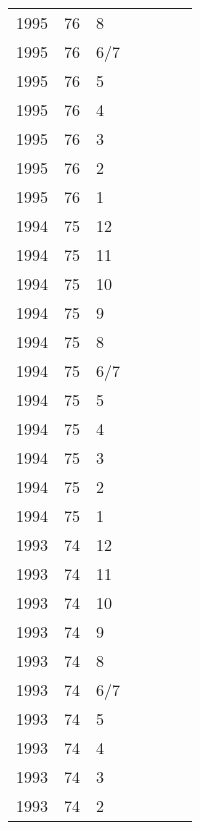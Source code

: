 \begin{longtable}{ |l|l|l|l|p{2.7cm}|l|p{2cm}| }
 1995 & 76 &     8 &         &                &  & \\
 1995 & 76 &   6/7 &         &                &  & \\
 1995 & 76 &     5 &         &                &  & \\
 1995 & 76 &     4 &         &                &  & \\
 1995 & 76 &     3 &         &                &  & \\
 1995 & 76 &     2 &         &                &  & \\
 1995 & 76 &     1 &         &                &  & \\
 1994 & 75 &    12 &         &                &  & \\
 1994 & 75 &    11 &         &                &  & \\
 1994 & 75 &    10 &         &                &  & \\
 1994 & 75 &     9 &         &                &  & \\
 1994 & 75 &     8 &         &                &  & \\
 1994 & 75 &   6/7 &         &                &  & \\
 1994 & 75 &     5 &         &                &   & \\
 1994 & 75 &     4 &         &                &  & \\
 1994 & 75 &     3 &         &                &  & \\
 1994 & 75 &     2 &         &                &  & \\
 1994 & 75 &     1 &         &                &  & \\
 1993 & 74 &    12 &         &                &  & \\
 1993 & 74 &    11 &         &                &  & \\
 1993 & 74 &    10 &         &                &  & \\
 1993 & 74 &     9 &         &                &  & \\
 1993 & 74 &     8 &         &                &  & \\
 1993 & 74 &   6/7 &         &                &  & \\
 1993 & 74 &     5 &         &                &  & \\
 1993 & 74 &     4 &         &                &  & \\
 1993 & 74 &     3 &         &                &  & \\
 1993 & 74 &     2 &         &                &  & \\

\end{longtable}
